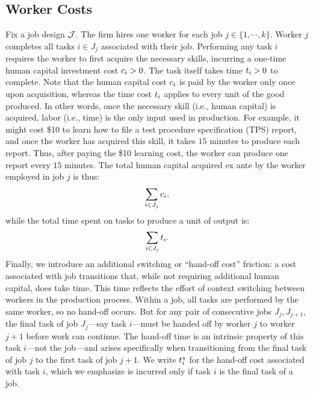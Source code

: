 \documentclass{article}
\theoremstyle{plain}
\theoremstyle{plain}
\begin{document}


\subsection{Worker Costs}


Fix a job design $\mathcal{J}$.  The firm hires one worker for each job $j \in \{1, \cdots, k\}$.  
Worker $j$ completes all tasks $i \in J_j$ associated with their job. 
Performing any task $i$ requires the worker to first acquire the necessary skills, incurring a one-time human capital investment cost \( c_{i} > 0 \).
The task itself takes time $t_{i}>0$ to complete. 
Note that the human capital cost $c_{i}$ is paid by the worker only once upon acquisition, whereas the time cost $t_{i}$ applies to every unit of the good produced.
In other words, once the necessary skill (i.e., human capital) is acquired, labor (i.e., time) is the only input used in production.
For example, it might cost \$10 to learn how to file a test procedure specification (TPS) report, and once the worker has acquired this skill, it takes $15$ minutes to produce each report.
Thus, after paying the \$10 learning cost, the worker can produce one report every $15$ minutes.
The total human capital acquired ex ante by the worker employed in job $j$ is thus:
\[
\sum_{i \in J_j} c_{i},
\]
while the total time spent on tasks to produce a unit of output is:
\[
\sum_{i \in J_j} t_{i}.
\]
Finally, we introduce an additional switching or ``hand-off cost” friction: a cost associated with job transitions that, while not requiring additional human capital, does take time.
This time reflects the effort of context switching between workers in the production process.
Within a job, all tasks are performed by the same worker, so no hand-off occurs.
But for any pair of consecutive jobs $J_j, J_{j+1}$, the final task of job $J_j$---say task $i$---must be handed off by worker $j$ to worker $j+1$ before work can continue. 
The hand-off time is an intrinsic property of this task $i$---not the job---and arises specifically when transitioning from the final task of job $j$ to the first task of job $j+1$. We write $t^{s}_{i}$ for the hand-off cost associated with task $i$, which we emphasize is incurred only if task $i$ is the final task of a job.
\end{document}
